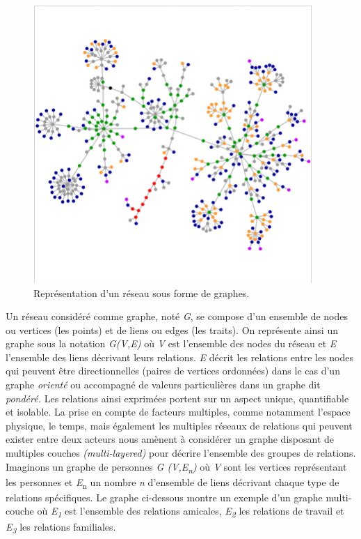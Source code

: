 \begin{figure}
    \centering
    \includegraphics[width=4.178in,height=4.1449in]{figures/chap3/chapitre3-img2.png}
    \caption{Représentation d'un r\'eseau sous forme de graphes.}
\end{figure}


Un r\'eseau consid\'er\'e comme graphe, not\'e \textit{G}, se compose
d{\textquoteright}un ensemble de nodes ou vertices (les points) et de
liens ou edges (les traits). On repr\'esente ainsi un graphe sous la
notation \textit{G(V,E)} o\`u \textit{V }est l{\textquoteright}ensemble
des nodes du r\'eseau et \textit{E} l{\textquoteright}ensemble des
liens\textit{ }d\'ecrivant leurs relations. \textit{E }d\'ecrit les
relations entre les nodes qui peuvent \^etre directionnelles (paires de
vertices ordonn\'ees) dans le cas d{\textquoteright}un graphe
\textit{orient\'e }ou accompagn\'e de valeurs particuli\`eres dans un
graphe dit \textit{pond\'er\'e. }Les relations ainsi exprim\'ees
portent sur un aspect unique, quantifiable et isolable. La prise en
compte de facteurs multiples, comme notamment l{\textquoteright}espace
physique, le temps, mais \'egalement les multiples r\'eseaux de
relations qui peuvent exister entre deux acteurs nous am\`enent \`a
consid\'erer un graphe disposant de multiples couches
\textit{(}\textit{multi-layered)} pour d\'ecrire
l{\textquoteright}ensemble des groupes de relations. Imaginons un
graphe de personnes \textit{G (V,E}\textit{\textsubscript{n}}\textit{)} o\`u \textit{V }sont les
vertices repr\'esentant les personnes et \textit{E}\textsubscript{n} un
nombre \textit{n }d{\textquoteright}ensemble de liens\textit{
}d\'ecrivant chaque type de relations sp\'ecifiques. Le graphe
ci-dessous montre un exemple d{\textquoteright}un graphe multi-couche
o\`u \textit{E}\textit{\textsubscript{1}} est
l{\textquoteright}ensemble des relations amicales,
\textit{E}\textit{\textsubscript{2}}\textsubscript{ }les relations de
travail et \textit{E}\textit{\textsubscript{3}}\textsubscript{ }les
relations familiales.

